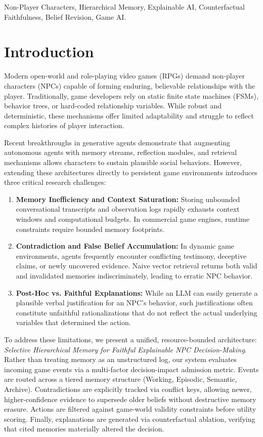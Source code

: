 \documentclass[conference]{IEEEtran}
\begin{document}
\begin{IEEEkeywords}
Non-Player Characters, Hierarchical Memory, Explainable AI, Counterfactual Faithfulness, Belief Revision, Game AI.
\end{IEEEkeywords}

\section{Introduction}
Modern open-world and role-playing video games (RPGs) demand non-player characters (NPCs) capable of forming enduring, believable relationships with the player. Traditionally, game developers rely on static finite state machines (FSMs), behavior trees, or hard-coded relationship variables. While robust and deterministic, these mechanisms offer limited adaptability and struggle to reflect complex histories of player interaction.

Recent breakthroughs in generative agents \cite{park2023generative} demonstrate that augmenting autonomous agents with memory streams, reflection modules, and retrieval mechanisms allows characters to sustain plausible social behaviors. However, extending these architectures directly to persistent game environments introduces three critical research challenges:
\begin{enumerate}
    \item \textbf{Memory Inefficiency and Context Saturation:} Storing unbounded conversational transcripts and observation logs rapidly exhausts context windows and computational budgets. In commercial game engines, runtime constraints require bounded memory footprints.
    \item \textbf{Contradiction and False Belief Accumulation:} In dynamic game environments, agents frequently encounter conflicting testimony, deceptive claims, or newly uncovered evidence. Naive vector retrieval returns both valid and invalidated memories indiscriminately, leading to erratic NPC behavior.
    \item \textbf{Post-Hoc vs. Faithful Explanations:} While an LLM can easily generate a plausible verbal justification for an NPC's behavior, such justifications often constitute unfaithful rationalizations that do not reflect the actual underlying variables that determined the action.
\end{enumerate}

To address these limitations, we present a unified, resource-bounded architecture: \textit{Selective Hierarchical Memory for Faithful Explainable NPC Decision-Making}. Rather than treating memory as an unstructured log, our system evaluates incoming game events via a multi-factor decision-impact admission metric. Events are routed across a tiered memory structure (Working, Episodic, Semantic, Archive). Contradictions are explicitly tracked via conflict keys, allowing newer, higher-confidence evidence to supersede older beliefs without destructive memory erasure. Actions are filtered against game-world validity constraints before utility scoring. Finally, explanations are generated via counterfactual ablation, verifying that cited memories materially altered the decision.
\end{document}
